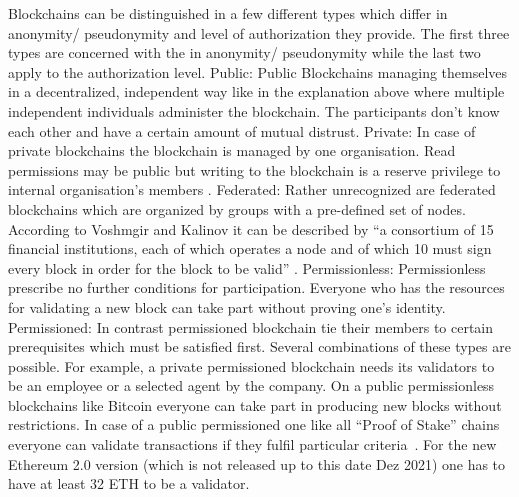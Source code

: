 Blockchains can be distinguished in a few different types which differ in anonymity/ pseudonymity and level of authorization they provide. The first three types are concerned with the in anonymity/ pseudonymity while the last two apply to the authorization level.
Public: Public Blockchains managing themselves in a decentralized, independent way like in the explanation above where multiple independent individuals administer the blockchain. The participants don’t know each other and have a certain amount of mutual distrust.
Private: In case of private blockchains the blockchain is managed by one organisation. Read permissions may be public but writing to the blockchain is a reserve privilege to internal organisation’s members \cite{Shermin2017}.
Federated: Rather unrecognized are federated blockchains which are organized by groups with a pre-defined set of nodes. According to Voshmgir and Kalinov it can be described by “a consortium of 15 financial institutions, each of which operates a node and of which 10 must sign every block in order for the block to be valid” \cite{Shermin2017}.
Permissionless: Permissionless prescribe no further conditions for participation. Everyone who has the resources for validating a new block can take part without proving one’s identity. 
Permissioned: In contrast permissioned blockchain tie their members to certain prerequisites which must be satisfied first.
Several combinations of these types are possible. For example, a private permissioned blockchain needs its validators to be an employee or a selected agent by the company. On a public permissionless blockchains like Bitcoin everyone can take part in producing new blocks without restrictions. In case of a public permissioned one like  all “Proof of Stake” chains everyone can validate transactions if they fulfil particular criteria~\cite{Shermin2017}. For the new Ethereum 2.0 version (which is not released up to this date Dez 2021) one has to have at least 32 ETH to be a validator.